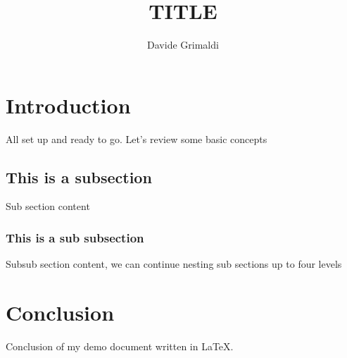\documentclass{article}
\title{TITLE}
\author{Davide Grimaldi}
\date{} %
\begin{document}
 

    \maketitle %

    \section{Introduction}

        All set up and ready to go. Let's review some basic concepts

        \subsection{This is a subsection}

            Sub section content

        \subsubsection{This is a sub subsection}

            Subsub section content, we can continue nesting sub sections up to four levels

    \section{Conclusion}

        Conclusion of my demo document written in \LaTeX. %
\end{document}
